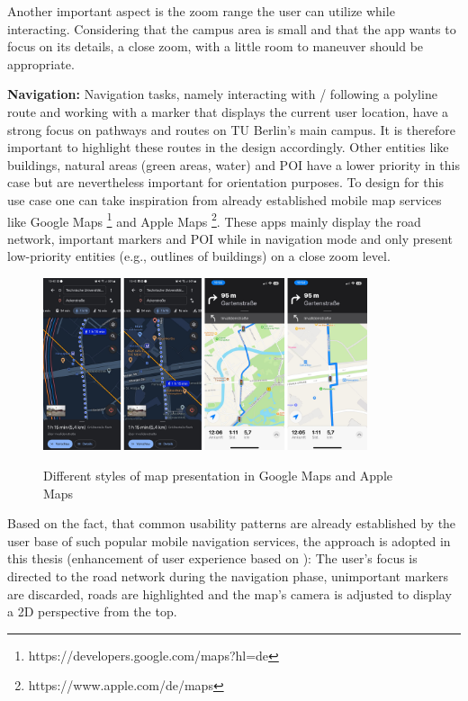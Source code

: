 Another important aspect is the zoom range the user can utilize while interacting. Considering that the campus area is small and that the app wants to focus on its details, a close zoom, with a little room to maneuver should be appropriate.

\textbf{Navigation:} Navigation tasks, namely interacting with / following a polyline route and working with a marker that displays the current user location, have a strong focus on pathways and routes on TU Berlin's main campus. It is therefore important to highlight these routes in the design accordingly. Other entities like buildings, natural areas (green areas, water) and POI have a lower priority in this case but are nevertheless important for orientation purposes. To design for this use case one can take inspiration from already established mobile map services like Google Maps \footnote{https://developers.google.com/maps?hl=de} and Apple Maps \footnote{https://www.apple.com/de/maps}. These apps mainly display the road network, important markers and POI while in navigation mode and only present low-priority entities (e.g., outlines of buildings) on a close zoom level.

\begin{figure}[H]
	\centering
	\includegraphics[width=0.85\textwidth]{images/map_design_google_apple.png}\\
	\caption{Different styles of map presentation in Google Maps and Apple Maps}
\end{figure}

Based on the fact, that common usability patterns are already established by the user base of such popular mobile navigation services, the approach is adopted in this thesis (enhancement of user experience based on \cite{jakobs_law}): The user's focus is directed to the road network during the navigation phase, unimportant markers are discarded, roads are highlighted and the map's camera is adjusted to display a 2D perspective from the top.

